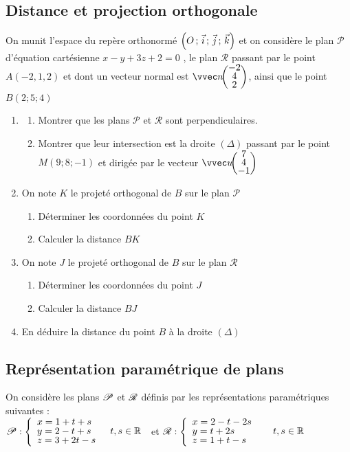 \documentclass[oneside,12pt]{book}          %
\begin{document}
\subsection{Distance et projection orthogonale}
On munit l'espace du repère orthonormé $\left(O\,;\,\Vec{i}\,;\,\Vec{j}\,;\,\Vec{k}\right)$ et on considère le plan $\mathscr{P}$ d'équation cartésienne $x-y+3z+2=0$ , le plan $\mathscr{R}$ passant par le point $A(-2,1,2)$ et dont un vecteur normal est $\vcoord{n}{-2\\4\\2}$,  ainsi que le point $B(2;5;4)$
\begin{enumerate}
    \item \begin{enumerate}
        \item Montrer que les plans $\mathscr{P}$ et $\mathscr{R}$ sont perpendiculaires.
        \item Montrer que leur intersection est la droite $(\Delta)$ passant par le point $M(9;8;-1)$ et dirigée par le vecteur $\vcoord{u}{7\\4\\-1}$
    \end{enumerate}
    \item On note $K$ le projeté orthogonal de $B$ sur le plan $\mathscr{P}$
    \begin{enumerate}
        \item Déterminer les coordonnées du point $K$
        \item Calculer la distance $BK$
    \end{enumerate}
    \item On note $J$ le projeté orthogonal de $B$ sur le plan $\mathscr{R}$
    \begin{enumerate}
        \item Déterminer les coordonnées du point $J$
        \item Calculer la distance $BJ$
    \end{enumerate}
    \item En déduire la distance du point $B$ à la droite $(\Delta)$
\end{enumerate}



\subsection{Représentation paramétrique de plans}
On considère les plans ${\mathscr{P}}$ et ${\mathscr{R}}$ définis par les représentations paramétriques suivantes :\\[5pt]
$\Pcal : \accol{x=1+t+s\\y=2-t+s~~~~~~t,s\in\RR\\z=3+2t-s}$ \hspace{2cm} et \hspace{2cm} $\Rcal : \accol{x=2-t-2s\\y=t+2s~~~~~~~~~~~~t,s\in\RR\\z=1+t-s}$
\end{document}
